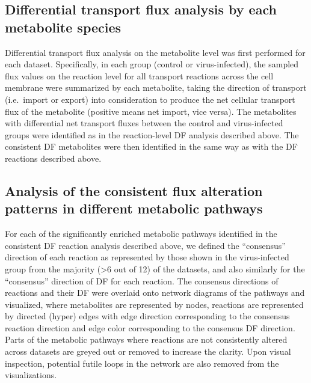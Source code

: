 \documentclass[12pt,twoside,openany,\mydriver]{thesis}  %
\begin{document}
\hypertarget{differential-transport-flux-analysis-by-each-metabolite-species}{%
\subsection{Differential transport flux analysis by each metabolite species}\label{differential-transport-flux-analysis-by-each-metabolite-species}}

Differential transport flux analysis on the metabolite level was first performed for each dataset. Specifically, in each group (control or virus-infected), the sampled flux values on the reaction level for all transport reactions across the cell membrane were summarized by each metabolite, taking the direction of transport (i.e.~import or export) into consideration to produce the net cellular transport flux of the metabolite (positive means net import, vice versa). The metabolites with differential net transport fluxes between the control and virus-infected groups were identified as in the reaction-level DF analysis described above. The consistent DF metabolites were then identified in the same way as with the DF reactions described above.

\hypertarget{analysis-of-the-consistent-flux-alteration-patterns-in-different-metabolic-pathways}{%
\subsection{Analysis of the consistent flux alteration patterns in different metabolic pathways}\label{analysis-of-the-consistent-flux-alteration-patterns-in-different-metabolic-pathways}}

For each of the significantly enriched metabolic pathways identified in the consistent DF reaction analysis described above, we defined the ``consensus'' direction of each reaction as represented by those shown in the virus-infected group from the majority (\textgreater{}6 out of 12) of the datasets, and also similarly for the ``consensus'' direction of DF for each reaction. The consensus directions of reactions and their DF were overlaid onto network diagrams of the pathways and visualized, where metabolites are represented by nodes, reactions are represented by directed (hyper) edges with edge direction corresponding to the consensus reaction direction and edge color corresponding to the consensus DF direction. Parts of the metabolic pathways where reactions are not consistently altered across datasets are greyed out or removed to increase the clarity. Upon visual inspection, potential futile loops in the network are also removed from the visualizations.
\end{document}
